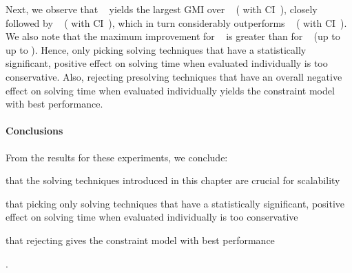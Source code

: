 Next, we observe that ~
yields the largest \gls{GMI} over ~ (\printGMI{%
  \SolvTechDisableAllBadPrePlusSolvingTimeSpeedupPrePlusSolvingTimeRegularSpeedupGmean%
} with \gls{CI}~\printGMICI{%
  \SolvTechDisableAllBadPrePlusSolvingTimeSpeedupPrePlusSolvingTimeRegularSpeedupCiMin%
}{%
  \SolvTechDisableAllBadPrePlusSolvingTimeSpeedupPrePlusSolvingTimeRegularSpeedupCiMax%
}), closely followed by ~
(\printGMI{%
  \SolvTechDisableAllPrePlusSolvingTimeSpeedupPrePlusSolvingTimeRegularSpeedupGmean%
} with \gls{CI}~\printGMICI{%
  \SolvTechDisableAllPrePlusSolvingTimeSpeedupPrePlusSolvingTimeRegularSpeedupCiMin%
}{%
  \SolvTechDisableAllPrePlusSolvingTimeSpeedupPrePlusSolvingTimeRegularSpeedupCiMax%
}),
which in turn considerably outperforms ~
(\printGMI{%
  \SolvTechEnableOnlyAllGoodPrePlusSolvingTimeSpeedupPrePlusSolvingTimeRegularSpeedupGmean%
} with \gls{CI}~\printGMICI{%
  \SolvTechEnableOnlyAllGoodPrePlusSolvingTimeSpeedupPrePlusSolvingTimeRegularSpeedupCiMin%
}{%
  \SolvTechEnableOnlyAllGoodPrePlusSolvingTimeSpeedupPrePlusSolvingTimeRegularSpeedupCiMax%
}).
%
We also note that the maximum improvement for ~ is greater than for ~ (up to \printZCNorm{%
  \SolvTechDisableAllBadPrePlusSolvingTimeSpeedupPrePlusSolvingTimeZeroCenteredSpeedupMax%
} \versus up to \printZCNorm{%
  \SolvTechDisableAllPrePlusSolvingTimeSpeedupPrePlusSolvingTimeZeroCenteredSpeedupMax
}).
%
Hence, only picking solving techniques that have a statistically significant,
positive effect on solving time when evaluated individually is too conservative.
%
Also, rejecting \gls{presolving} techniques that have an overall negative effect
on solving time when evaluated individually yields the \gls{constraint model}
with best performance.


\paragraph{Conclusions}

From the results for these experiments, we conclude:
%
\begin{enumerate*}[label=(\roman*), itemjoin={;\ }, itemjoin*={; and\ }]
  \item that the solving techniques introduced in this chapter are crucial for
    scalability
  \item that picking only solving techniques that have a statistically
    significant, positive effect on solving time when evaluated individually is
    too conservative
  \item that rejecting  gives the \gls{constraint model} with best
    performance
\end{enumerate*}.


